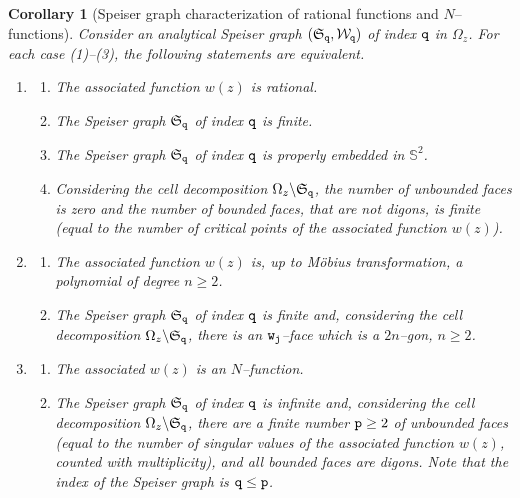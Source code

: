 \documentclass[final,3p,times]{elsarticle}
\newcommand{\esf}{\ensuremath{{\mathbb S}^2}}
\newtheorem{corollary}[theorem]{Corollary}
\theoremstyle{definition}
\begin{document}
\begin{corollary}[Speiser graph characterization of 
rational functions and $N$--functions]
\label{cor:Speiser-graph-characterization}
Consider an analytical Speiser graph 
$(\mathfrak{S}_{\tt q}, \mathcal{W}_{\tt q})$ of index ${\tt q}$ in $\Omega_z$.
For each case (1)--(3), the following statements are equivalent.
\begin{enumerate}[label=\arabic*.,leftmargin=*]
\item 
\begin{enumerate}[label=\roman*),leftmargin=*]
\item 
The associated function $w(z)$ is rational.
	
\item 
The Speiser graph $\mathfrak{S}_{\tt q}$ of index $\tt q$ is finite. 


\item 
The Speiser graph 
$\mathfrak{S}_{\tt q}$ of index $\tt q$ is properly embedded in $\esf$.


\item 
Considering the cell decomposition 
$\Omega_z \backslash \mathfrak{S}_{\tt q}$, 
the number of unbounded faces
is zero and the number of bounded faces,
that are not digons, is finite 
(equal to the number of critical points of 
the associated function $w(z)$).

\end{enumerate}
	
\smallskip	
\item	
\begin{enumerate}[label=\roman*),leftmargin=*]
\item The associated function $w(z)$ is, up to M\"obius transformation,
a polynomial of degree $n\geq 2$.

\item 
The Speiser graph $\mathfrak{S}_{\tt q}$ of index $\tt q$ is finite and,
considering the cell decomposition	
$\Omega_z \backslash \mathfrak{S}_{\tt q}$,
there is an ${\tt w}_{\tt j}$--face which is a 
$2n$--gon, $n\geq 2$.

\end{enumerate}

\smallskip	
\item 
\begin{enumerate}[label=\roman*),leftmargin=*]	
\item 
The associated $w(z)$ is an $N$--function.

\item 
The Speiser graph $\mathfrak{S}_{\tt q}$ of index $\tt q$ is infinite and,
considering the cell decomposition	
$\Omega_z \backslash \mathfrak{S}_{\tt q}$,
there are a finite number ${\tt p}\geq 2$ of unbounded faces 
(equal to the number of singular values of the associated function $w(z)$, counted with multiplicity),
and all bounded faces are digons.	
Note that the index of the Speiser graph is ${\tt q}\leq{\tt p}$.
	
\end{enumerate}
\end{enumerate}
\end{corollary}
\end{document}
